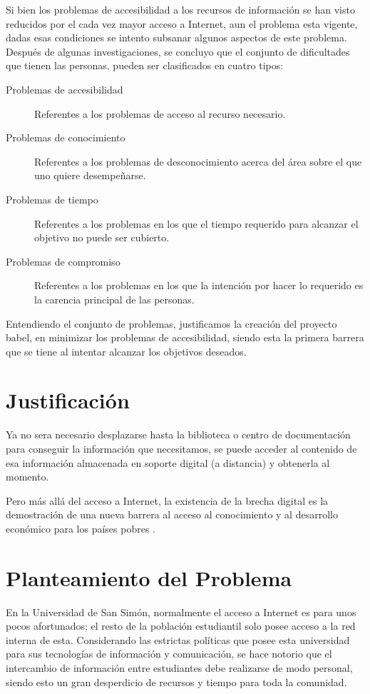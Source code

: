 \documentclass[letter,11pt,oneside,spanish]{article}
\begin{document}
Si bien los problemas de accesibilidad a los recursos de información se han visto reducidos por el
cada vez mayor acceso a Internet, aun el problema esta vigente, dadas esas condiciones se intento
subsanar algunos aspectos de este problema. Después de algunas investigaciones, se concluyo que el
conjunto de dificultades que tienen las personas, pueden ser clasificados en cuatro tipos:

\begin{description}
\item [Problemas de accesibilidad] Referentes a los problemas de acceso al recurso necesario.
\item [Problemas de conocimiento] Referentes a los problemas de desconocimiento acerca del área 
sobre el que uno quiere desempeñarse.
\item [Problemas de tiempo] Referentes a los problemas en los que el tiempo requerido para alcanzar
el objetivo no puede ser cubierto.
\item [Problemas de compromiso] Referentes a los problemas en los que la intención por hacer lo
requerido es la carencia principal de las personas.
\end{description}

Entendiendo el conjunto de problemas, justificamos la creación del proyecto babel, en minimizar los
problemas de accesibilidad, siendo esta la primera barrera que se tiene al intentar alcanzar los
objetivos deseados.

\section{Justificación}
Ya no sera necesario desplazarse hasta la biblioteca o centro de documentación para conseguir la
información que necesitamos, se puede acceder al contenido de esa información almacenada en soporte
digital (a distancia) y obtenerla al momento.

Pero más allá del acceso a Internet, la existencia de la brecha digital es la demostración de
una nueva barrera al acceso al conocimiento y al desarrollo económico para los países
pobres \cite{brecha}.

\section{Planteamiento del Problema}
En la Universidad de San Simón, normalmente el acceso a Internet es para unos pocos afortunados; el
resto de la población estudiantil solo posee acceso a la red interna de esta. Considerando las
estrictas políticas que posee esta universidad para sus tecnologías de información y comunicación, se
hace notorio que el intercambio de información entre estudiantes debe realizarse de modo personal, siendo esto un gran desperdicio de recursos y tiempo para toda la comunidad.
\end{document}
